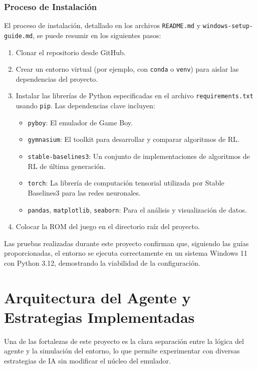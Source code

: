 \documentclass[12pt, oneside, openany]{book}
\begin{document}
\subsubsection{Proceso de Instalación}
El proceso de instalación, detallado en los archivos \texttt{README.md} y \texttt{windows-setup-guide.md}, se puede resumir en los siguientes pasos:
\begin{enumerate}
    \item Clonar el repositorio desde GitHub.
    \item Crear un entorno virtual (por ejemplo, con \texttt{conda} o \texttt{venv}) para aislar las dependencias del proyecto.
    \item Instalar las librerías de Python especificadas en el archivo \texttt{requirements.txt} usando \texttt{pip}. Las dependencias clave incluyen:
    \begin{itemize}
        \item \texttt{pyboy}: El emulador de Game Boy.
        \item \texttt{gymnasium}: El toolkit para desarrollar y comparar algoritmos de RL.
        \item \texttt{stable-baselines3}: Un conjunto de implementaciones de algoritmos de RL de última generación.
        \item \texttt{torch}: La librería de computación tensorial utilizada por Stable Baselines3 para las redes neuronales.
        \item \texttt{pandas}, \texttt{matplotlib}, \texttt{seaborn}: Para el análisis y visualización de datos.
    \end{itemize}
    \item Colocar la ROM del juego en el directorio raíz del proyecto.
\end{enumerate}
Las pruebas realizadas durante este proyecto confirman que, siguiendo las guías proporcionadas, el entorno se ejecuta correctamente en un sistema Windows 11 con Python 3.12, demostrando la viabilidad de la configuración.

\section{Arquitectura del Agente y Estrategias Implementadas}
\label{sec:arquitectura_agentes}

Una de las fortalezas de este proyecto es la clara separación entre la lógica del agente y la simulación del entorno, lo que permite experimentar con diversas estrategias de IA sin modificar el núcleo del emulador.
\end{document}
